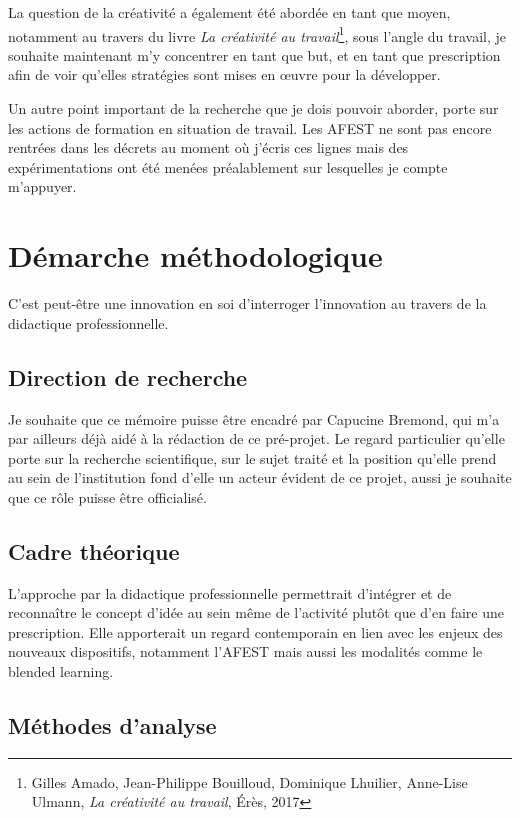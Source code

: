 \documentclass{article}
\begin{document}
La question de la créativité a également été abordée en tant que moyen, notamment au travers du livre \textit{La créativité au travail}\footnote{Gilles Amado, Jean-Philippe Bouilloud, Dominique Lhuilier, Anne-Lise Ulmann, \textit{La créativité au travail}, Érès, 2017}, sous l'angle du travail, je souhaite maintenant m'y concentrer en tant que but, et en tant que prescription afin de voir qu'elles stratégies sont mises en œuvre pour la développer.

Un autre point important de la recherche que je dois pouvoir aborder, porte sur les actions de formation en situation de travail. Les AFEST ne sont pas encore rentrées dans les décrets au moment où j'écris ces lignes mais des expérimentations ont été menées préalablement sur lesquelles je compte m'appuyer. 

\section{Démarche méthodologique}

C'est peut-être une innovation en soi d'interroger l'innovation au travers de la didactique professionnelle.

\subsection{Direction de recherche}

Je souhaite que ce mémoire puisse être encadré par Capucine Bremond, qui m'a par ailleurs déjà aidé à la rédaction de ce pré-projet. Le regard particulier qu'elle porte sur la recherche scientifique, sur le sujet traité et la position qu'elle prend au sein de l'institution fond d'elle un acteur évident de ce projet, aussi je souhaite que ce rôle puisse être officialisé. 

\subsection{Cadre théorique}

L'approche par la didactique professionnelle permettrait d'intégrer et de reconnaître le concept d'idée au sein même de l'activité plutôt que d'en faire une prescription. Elle apporterait un regard contemporain en lien avec les enjeux des nouveaux dispositifs, notamment l'AFEST mais aussi les modalités comme le blended learning.

\subsection{Méthodes d'analyse}
\end{document}
